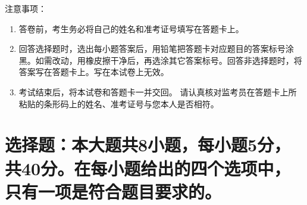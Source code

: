 \documentclass[11pt,space]{ctexart} %
\begin{document}
\juemi %
{\heiti 注意事项}：
\begin{enumerate}[itemsep=-0.3em,topsep=0pt]
\item 答卷前，考生务必将自己的姓名和准考证号填写在答题卡上。
\item 回答选择题时，选出每小题答案后，用铅笔把答题卡对应题目的答案标号涂黑。如需改动，用橡皮擦干净后，再选涂其它答案标号。回答非选择题时，将答案写在答题卡上。写在本试卷上无效。
\item 考试结束后，将本试卷和答题卡一并交回。
请认真核对监考员在答题卡上所粘贴的条形码上的姓名、准考证号与您本人是否相符。	
\end{enumerate}

\section{选择题：本大题共8小题，每小题5分，共40分。在每小题给出的四个选项中，只有一项是符合题目要求的。}
\end{document}
